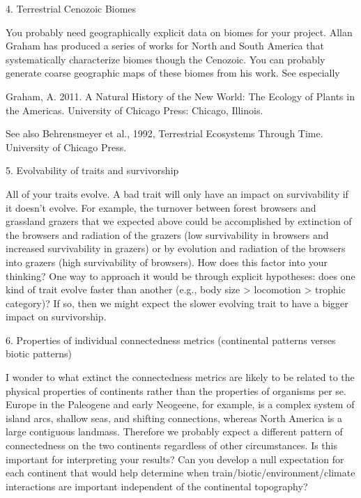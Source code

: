\documentclass{article}
\begin{document}
4. Terrestrial Cenozoic Biomes

You probably need geographically explicit data on biomes for your project.  Allan Graham has produced a series of works for North and South America that systematically characterize biomes though the Cenozoic.  You can probably generate coarse geographic maps of these biomes from his work.  See especially

Graham, A.  2011.  A Natural History of the New World:  The Ecology of Plants in the Americas.  University of Chicago Press: Chicago, Illinois.

See also Behrensmeyer et al., 1992, Terrestrial Ecosystems Through Time.  University of Chicago Press.

5. Evolvability of traits and survivorship

All of your traits evolve.  A bad trait will only have an impact on survivability if it doesn’t evolve.  For example, the turnover between forest browsers and grassland grazers that we expected above could be accomplished by extinction of the browsers and radiation of the grazers (low survivability in browsers and increased survivability in grazers) or by evolution and radiation of the browsers into grazers (high survivability of browsers).  How does this factor into your thinking?  One way to approach it would be through explicit hypotheses:  does one kind of trait evolve faster than another (e.g.,  body size > locomotion > trophic category)?  If so, then we might expect the slower evolving trait to have a bigger impact on survivorship. 

6. Properties of individual connectedness metrics (continental patterns verses biotic patterns)

I wonder to what extinct the connectedness metrics are likely to be related to the physical properties of continents rather than the properties of organisms per se.  Europe in the Paleogene and early Neogeene, for example, is a complex system of island arcs, shallow seas, and shifting connections, whereas North America is a large contiguous landmass.  Therefore we probably expect a different pattern of connectedness on the two continents regardless of other circumstances.  Is this important for interpreting your results?  Can you develop a null expectation for each continent that would help determine when train/biotic/environment/climate interactions are important independent of the continental topography?
\end{document}
